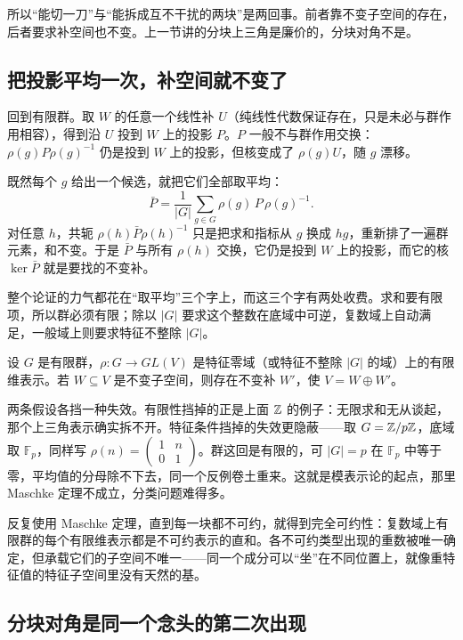 所以``能切一刀''与``能拆成互不干扰的两块''是两回事。前者靠不变子空间的存在，后者要求补空间也不变。上一节讲的分块上三角是廉价的，分块对角不是。

\subsection{把投影平均一次，补空间就不变了}

回到有限群。取 \(W\) 的任意一个线性补 \(U\)（纯线性代数保证存在，只是未必与群作用相容），得到沿 \(U\) 投到 \(W\) 上的投影 \(P\)。\(P\) 一般不与群作用交换：\(\rho(g)P\rho(g)^{-1}\) 仍是投到 \(W\) 上的投影，但核变成了 \(\rho(g)U\)，随 \(g\) 漂移。

既然每个 \(g\) 给出一个候选，就把它们全部取平均：
\[
\bar P=\frac{1}{|G|}\sum_{g\in G}\rho(g)\,P\,\rho(g)^{-1}.
\]
对任意 \(h\)，共轭 \(\rho(h)\bar P\rho(h)^{-1}\) 只是把求和指标从 \(g\) 换成 \(hg\)，重新排了一遍群元素，和不变。于是 \(\bar P\) 与所有 \(\rho(h)\) 交换，它仍是投到 \(W\) 上的投影，而它的核 \(\ker\bar P\) 就是要找的不变补。

整个论证的力气都花在``取平均''三个字上，而这三个字有两处收费。求和要有限项，所以群必须有限；除以 \(|G|\) 要求这个整数在底域中可逆，复数域上自动满足，一般域上则要求特征不整除 \(|G|\)。

\begin{theorem}[Maschke]
设 \(G\) 是有限群，\(\rho:G\to GL(V)\) 是特征零域（或特征不整除 \(|G|\) 的域）上的有限维表示。若 \(W\subseteq V\) 是不变子空间，则存在不变补 \(W'\)，使 \(V=W\oplus W'\)。
\end{theorem}

两条假设各挡一种失效。有限性挡掉的正是上面 \(\mathbb{Z}\) 的例子：无限求和无从谈起，那个上三角表示确实拆不开。特征条件挡掉的失效更隐蔽——取 \(G=\mathbb{Z}/p\mathbb{Z}\)，底域取 \(\mathbb F_p\)，同样写 \(\rho(n)=\begin{pmatrix}1&n\\0&1\end{pmatrix}\)。群这回是有限的，可 \(|G|=p\) 在 \(\mathbb F_p\) 中等于零，平均值的分母除不下去，同一个反例卷土重来。这就是模表示论的起点，那里 Maschke 定理不成立，分类问题难得多。

反复使用 Maschke 定理，直到每一块都不可约，就得到完全可约性：复数域上有限群的每个有限维表示都是不可约表示的直和。各不可约类型出现的重数被唯一确定，但承载它们的子空间不唯一——同一个成分可以``坐''在不同位置上，就像重特征值的特征子空间里没有天然的基。

\subsection{分块对角是同一个念头的第二次出现}


